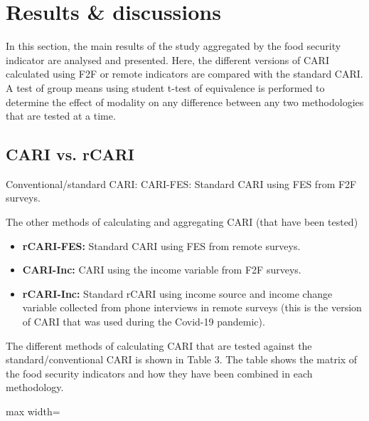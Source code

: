 \documentclass[11pt,harvard]{article}
\begin{document}
	\pagebreak
	
	\section{Results \& discussions}
	
	In this section, the main results of the study aggregated by the food security indicator are analysed and presented. Here, the different versions of CARI calculated using F2F or remote indicators are compared with the standard CARI. A test of group means using student t-test of equivalence is performed to determine the effect of modality on any difference between any two methodologies that are tested at a time. 
	
	\subsection{CARI vs. rCARI}
	
	Conventional/standard CARI:  CARI-FES: Standard CARI using FES from F2F surveys.
	
	The other methods of calculating and aggregating CARI (that have been tested)
	\begin{itemize}[label=--, left=1.5em]
		\item[1.] \textbf{rCARI-FES:} Standard CARI using FES from remote surveys.
		\item[2.] \textbf{CARI-Inc:} CARI using the income variable from F2F surveys.
		\item[3.] \textbf{rCARI-Inc:} Standard rCARI using income source and income change variable collected from phone interviews in remote surveys (this is the version of CARI that was used during the Covid-19 pandemic).
	\end{itemize}
	
	The different methods of calculating CARI that are tested against the standard/conventional CARI is shown in Table 3. The table shows the matrix of the food security indicators and how they have been combined in each methodology.
	
		\begin{table}[htbp]
		\centering
		\begin{adjustbox} {max width=\textwidth}
			\begin{threeparttable}
				\caption{Matrix of the different aggregation methods and the indicators used for each methodology}
				\small
				 
				\label{tab:Aggregation_Table}
			\end{threeparttable}
		\end{adjustbox}
	\end{table}
		
\end{document}
